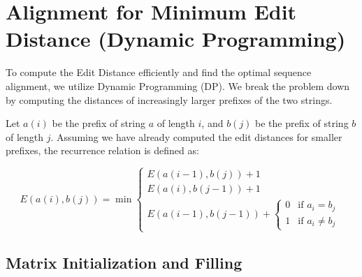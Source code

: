\documentclass[11pt,a4paper]{article}
\begin{document}
\section{Alignment for Minimum Edit Distance (Dynamic Programming)}

To compute the Edit Distance efficiently and find the optimal sequence alignment, we utilize Dynamic Programming (DP). We break the problem down by computing the distances of increasingly larger prefixes of the two strings.

Let \(a(i)\) be the prefix of string \(a\) of length \(i\), and \(b(j)\) be the prefix of string \(b\) of length \(j\). Assuming we have already computed the edit distances for smaller prefixes, the recurrence relation is defined as:

\begin{equation}
E(a(i), b(j)) = \min \begin{cases}
E(a(i-1), b(j)) + 1 \\
E(a(i), b(j-1)) + 1 \\
E(a(i-1), b(j-1)) + \begin{cases} 0 & \text{if } a_i = b_j \\ 1 & \text{if } a_i \neq b_j \end{cases}
\end{cases}
\end{equation}

\subsection{Matrix Initialization and Filling}
\end{document}
